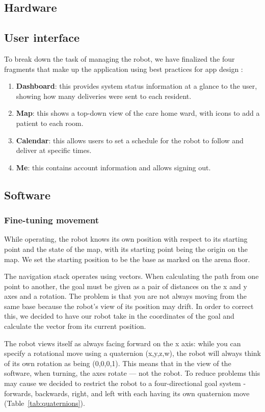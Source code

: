 \documentclass{article}
\begin{document}
\subsection{Hardware}

\subsection{User interface}
To break down the task of managing the robot, we have finalized the four fragments that make up the application using best practices for app design \cite{design, ux}:
\begin{enumerate}
  \item {\bf Dashboard}: this provides system status information at a glance to the user, showing how many deliveries were sent to each resident.
  \item {\bf Map}: this shows a top-down view of the care home ward, with icons to add a patient to each room.
  \item {\bf Calendar}: this allows users to set a schedule for the robot to follow and deliver at specific times.
  \item {\bf Me}: this contains account information and allows signing out. 
  \end{enumerate}
  
\subsection{Software}


\subsubsection{Fine-tuning movement}
While operating, the robot knows its own position with respect to its starting point and the state of the map, with its starting point being the origin on the map. We set the starting position to be the base as marked on the arena floor. 

The navigation stack operates using vectors. When calculating the path from one point to another, the goal must be given as a pair of distances on the x and y axes and a rotation. The problem is that you are not always moving from the same base because the robot's view of its position may drift. In order to correct this, we decided to have our robot take in the coordinates of the goal and calculate the vector from its current position.

The robot views itself as always facing forward on the x axis: while you can specify a rotational move using a quaternion (x,y,z,w), the robot will always think of its own rotation as being (0,0,0,1). This means that in the view of the software, when turning, the axes rotate --- not the robot. To reduce problems this may cause we decided to restrict the robot to a four-directional goal system - forwards, backwards, right, and left with each having its own quaternion move (Table~\ref{tab:quaternions}).
\end{document}
